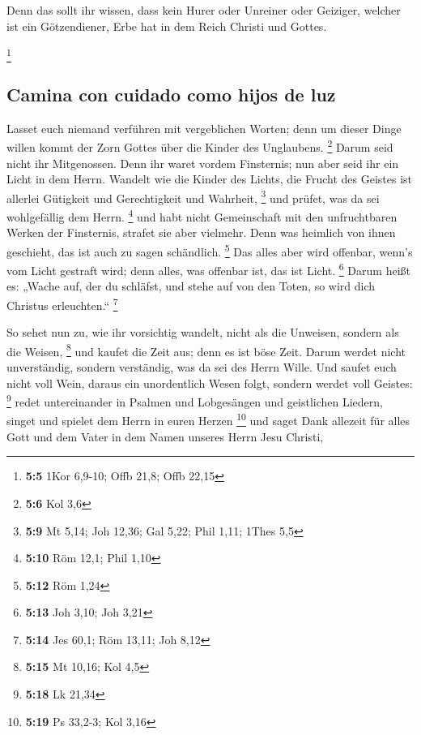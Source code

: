  Denn das sollt ihr wissen, dass kein Hurer oder Unreiner
oder Geiziger, welcher ist ein Götzendiener, Erbe hat in dem Reich
Christi und Gottes.

\footnote{\textbf{5:5} 1Kor 6,9-10; Offb 21,8; Offb 22,15}

\hypertarget{camina-con-cuidado-como-hijos-de-luz}{%
\subsection{Camina con cuidado como hijos de
luz}\label{camina-con-cuidado-como-hijos-de-luz}}

 Lasset euch niemand verführen mit vergeblichen Worten;
denn um dieser Dinge willen kommt der Zorn Gottes über die Kinder des
Unglaubens. \footnote{\textbf{5:6} Kol 3,6}  Darum seid
nicht ihr Mitgenossen.  Denn ihr waret vordem Finsternis;
nun aber seid ihr ein Licht in dem Herrn.  Wandelt wie die
Kinder des Lichts, die Frucht des Geistes ist allerlei Gütigkeit und
Gerechtigkeit und Wahrheit, \footnote{\textbf{5:9} Mt 5,14; Joh 12,36;
  Gal 5,22; Phil 1,11; 1Thes 5,5}  und prüfet, was da sei
wohlgefällig dem Herrn. \footnote{\textbf{5:10} Röm 12,1; Phil 1,10}
 und habt nicht Gemeinschaft mit den unfruchtbaren Werken
der Finsternis, strafet sie aber vielmehr.  Denn was
heimlich von ihnen geschieht, das ist auch zu sagen schändlich.
\footnote{\textbf{5:12} Röm 1,24}  Das alles aber wird
offenbar, wenn's vom Licht gestraft wird; denn alles, was offenbar ist,
das ist Licht. \footnote{\textbf{5:13} Joh 3,10; Joh 3,21}
 Darum heißt es: „Wache auf, der du schläfst, und stehe
auf von den Toten, so wird dich Christus erleuchten.`` \footnote{\textbf{5:14}
  Jes 60,1; Röm 13,11; Joh 8,12}

 So sehet nun zu, wie ihr vorsichtig wandelt, nicht als
die Unweisen, sondern als die Weisen, \footnote{\textbf{5:15} Mt 10,16;
  Kol 4,5}  und kaufet die Zeit aus; denn es ist böse
Zeit.  Darum werdet nicht unverständig, sondern
verständig, was da sei des Herrn Wille.  Und saufet euch
nicht voll Wein, daraus ein unordentlich Wesen folgt, sondern werdet
voll Geistes: \footnote{\textbf{5:18} Lk 21,34}  redet
untereinander in Psalmen und Lobgesängen und geistlichen Liedern, singet
und spielet dem Herrn in euren Herzen \footnote{\textbf{5:19} Ps 33,2-3;
  Kol 3,16}  und saget Dank allezeit für alles Gott und
dem Vater in dem Namen unseres Herrn Jesu Christi,

